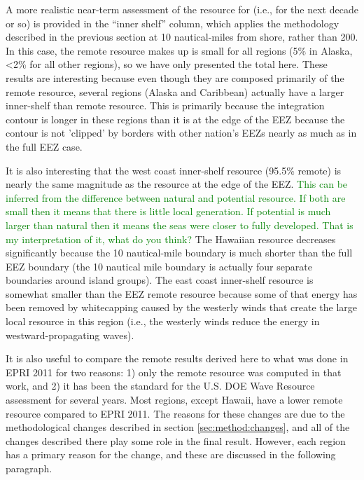 A more realistic near-term assessment of the resource for (i.e., for the next decade or so) is provided in the ``inner shelf'' column, which applies the methodology described in the previous section at 10 nautical-miles from shore, rather than 200. In this case, the remote resource makes up is small for all regions (5\% in Alaska, <2\% for all other regions), so we have only presented the total here. These results are interesting because even though they are composed primarily of the remote resource, several regions (Alaska and Caribbean) actually have a larger inner-shelf than remote resource. This is primarily because the integration contour is longer in these regions than it is at the edge of the EEZ because the contour is not 'clipped' by borders with other nation's EEZs nearly as much as in the full EEZ case.

It is also interesting that the west coast inner-shelf resource (95.5\% remote) is nearly the same magnitude as the resource at the edge of the EEZ. 
\textcolor{green}{This can be inferred from the difference between natural and potential resource. If both are small then it means that there is little local generation. If potential is much larger than natural then it means the seas were closer to fully developed. That is my interpretation of it, what do you think?} The Hawaiian resource decreases significantly because the 10 nautical-mile boundary is much shorter than the full EEZ boundary (the 10 nautical mile boundary is actually four separate boundaries around island groups). The east coast inner-shelf resource is somewhat smaller than the EEZ remote resource because some of that energy has been removed by whitecapping caused by the westerly winds that create the large local resource in this region (i.e., the westerly winds reduce the energy in westward-propagating waves).

It is also useful to compare the remote results derived here to what was done in EPRI 2011 for two reasons: 1) only the remote resource was computed in that work, and 2) it has been the standard for the U.S. DOE Wave Resource assessment for several years. 
Most regions, except Hawaii, have a lower remote resource compared to EPRI 2011. The reasons for these changes are due to the methodological changes described in section \ref{sec:method:changes}, and all of the changes described there play some role in the final result. However, each region has a {primary \em} reason for the change, and these are discussed in the following paragraph.

